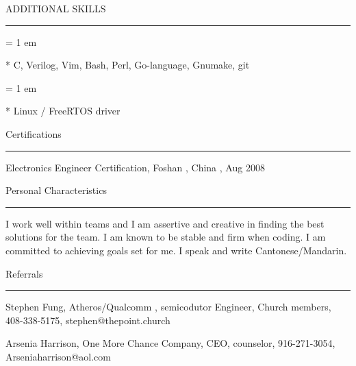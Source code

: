 { \medbreak } { \FFdd
ADDITIONAL SKILLS
}
{ \smallbreak } {\par\noindent\hrule} { \smallbreak }
{ \parindent = 1 em \item{*} 
 C, Verilog, Vim, Bash, Perl, Go-language, Gnumake, git
 }
{ \parindent = 1 em \item{*} 
 Linux / FreeRTOS driver
 }

{ \medbreak } { \FFdd
Certifications
}
{ \smallbreak } {\par\noindent\hrule} { \smallbreak }
Electronics Engineer Certification, Foshan , China , Aug 2008

{ \medbreak } { \FFdd
Personal Characteristics
}
{ \smallbreak } {\par\noindent\hrule} { \smallbreak }
I work well within teams and I am assertive and creative 
    in finding the best solutions for the team.
I am known to be stable and firm when coding.
I am committed to achieving goals set for me.
I speak and write 
Cantonese/Mandarin.

{ \medbreak } { \FFdd
Referrals
}
{ \smallbreak } {\par\noindent\hrule} { \smallbreak }

Stephen Fung,
Atheros/Qualcomm , semicodutor Engineer,
Church members,
408-338-5175,
stephen@thepoint.church

Arsenia Harrison,
One More Chance Company,
CEO,
counselor,
916-271-3054,
Arseniaharrison@aol.com

\break

\bye
